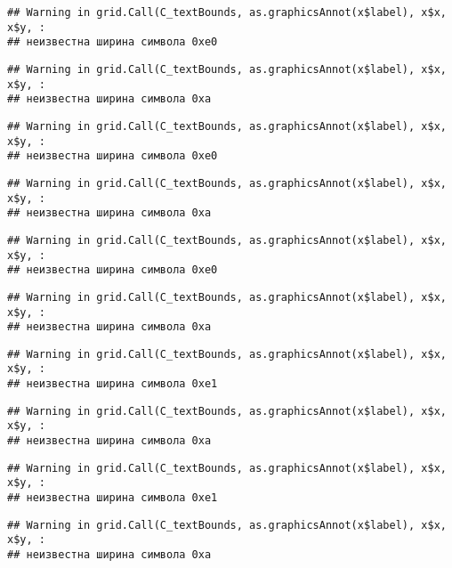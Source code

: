 \documentclass[
]{article}
\begin{document}
\begin{verbatim}
## Warning in grid.Call(C_textBounds, as.graphicsAnnot(x$label), x$x, x$y, :
## неизвестна ширина символа 0xe0
\end{verbatim}

\begin{verbatim}
## Warning in grid.Call(C_textBounds, as.graphicsAnnot(x$label), x$x, x$y, :
## неизвестна ширина символа 0xa
\end{verbatim}

\begin{verbatim}
## Warning in grid.Call(C_textBounds, as.graphicsAnnot(x$label), x$x, x$y, :
## неизвестна ширина символа 0xe0
\end{verbatim}

\begin{verbatim}
## Warning in grid.Call(C_textBounds, as.graphicsAnnot(x$label), x$x, x$y, :
## неизвестна ширина символа 0xa
\end{verbatim}

\begin{verbatim}
## Warning in grid.Call(C_textBounds, as.graphicsAnnot(x$label), x$x, x$y, :
## неизвестна ширина символа 0xe0
\end{verbatim}

\begin{verbatim}
## Warning in grid.Call(C_textBounds, as.graphicsAnnot(x$label), x$x, x$y, :
## неизвестна ширина символа 0xa
\end{verbatim}

\begin{verbatim}
## Warning in grid.Call(C_textBounds, as.graphicsAnnot(x$label), x$x, x$y, :
## неизвестна ширина символа 0xe1
\end{verbatim}

\begin{verbatim}
## Warning in grid.Call(C_textBounds, as.graphicsAnnot(x$label), x$x, x$y, :
## неизвестна ширина символа 0xa
\end{verbatim}

\begin{verbatim}
## Warning in grid.Call(C_textBounds, as.graphicsAnnot(x$label), x$x, x$y, :
## неизвестна ширина символа 0xe1
\end{verbatim}

\begin{verbatim}
## Warning in grid.Call(C_textBounds, as.graphicsAnnot(x$label), x$x, x$y, :
## неизвестна ширина символа 0xa
\end{verbatim}
\end{document}
